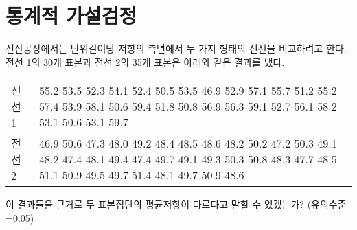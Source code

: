 \section{통계적 가설검정}
전산공장에서는 단위길이당 저항의 측면에서 두 가지 형태의 전선을 비교하려고
한다. 전선 1의 30개 표본과 전선 2의 35개 표본은 아래와 같은 결과를 냈다.

\begin{tabularx}{0.9\textwidth}{ l|X }
  \noalign{\smallskip}\hline\noalign{\smallskip}
  전선 1 & 
    55.2 53.5 52.3 54.1 52.4 50.5 53.5 46.9 52.9 57.1
    55.7 51.2 55.2 57.4 53.9 58.1 50.6 59.4 51.8 50.8
    56.9 56.3 59.1 52.7 56.1 58.2 53.1 50.6 53.1 59.7 \\
  전선 2 &
    46.9 50.6 47.3 48.0 49.2 48.4 48.5 48.6 48.2 50.2
    47.2 50.3 49.1 48.2 47.4 48.1 49.4 47.4 49.7 49.1
    49.3 50.3 50.8 48.3 47.7 48.5 51.1 50.9 49.5 49.7
    51.4 48.1 49.7 50.9 48.6
\end{tabularx}

이 결과들을 근거로 두 표본집단의 평균저항이 다르다고 말할 수 있겠는가?
{\small(유의수준=0.05)}


